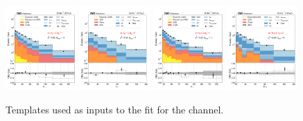 \begin{figure}[htb!]
    \includegraphics[width=0.24\textwidth]{chapters/Analysis/sectionStatisticalAnalysis/figures/fit/etau_cat_eq2_eq1}
    \includegraphics[width=0.24\textwidth]{chapters/Analysis/sectionStatisticalAnalysis/figures/fit/etau_cat_eq2_eq2}
    \includegraphics[width=0.24\textwidth]{chapters/Analysis/sectionStatisticalAnalysis/figures/fit/etau_cat_gt3_eq1}
    \includegraphics[width=0.24\textwidth]{chapters/Analysis/sectionStatisticalAnalysis/figures/fit/etau_cat_gt3_gt2}
    \caption{Templates used as inputs to the fit for the \cet channel.}
    \label{fig:analysis:method:mle:fits_templates_etau}
\end{figure}
